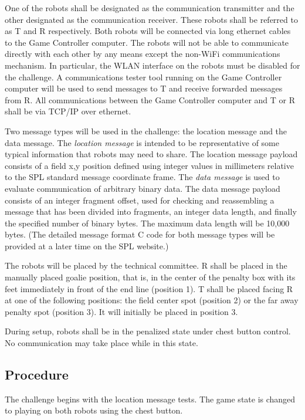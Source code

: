 \documentclass[12pt]{article}
\begin{document}
One of the robots shall be designated as
the communication transmitter and the other designated as the communication receiver. 
These robots shall be referred to as T and R respectively.
Both robots will be connected via long ethernet cables to the Game Controller computer.
The robots will not be able to communicate directly with each other by any means except the non-WiFi communications mechanism. In particular, the WLAN interface on the robots must be disabled for the challenge.
A communications tester tool running on the Game Controller computer will be used to send messages to T and receive forwarded messages from R. 
All communications between the Game Controller computer and T or R shall be via TCP/IP over ethernet.

Two message types will be used in the challenge: the location message and the data message. The {\em location message} is intended to be representative of some typical information that robots may need to share. The location message  payload consists of a field x,y position defined using integer values in millimeters relative to the SPL standard message coordinate frame.
The {\em data message} is used to evaluate communication of arbitrary binary data. The data message payload consists of an integer fragment offset, used for checking and reassembling a message that has been divided into fragments, an integer data length, and finally the specified number of binary bytes. The maximum data length will be 10,000 bytes. (The detailed message format C code for both message types will be provided at a later time on the SPL website.)

The robots will be placed by the technical committee. 
R shall be placed in the manually placed goalie
position, that is, in the center of the penalty box with its feet immediately in front of the end line (position 1).
T shall be placed facing R at one of the following positions: the field center spot (position 2) or the far away penalty spot (position 3). It will initially be placed in position 3.

During setup, robots shall be in the penalized state under chest button control. No communication may take place while in this state.

\subsection{Procedure}
The challenge begins with the location message tests. The game state is changed to playing on both robots using the chest button.
\end{document}
